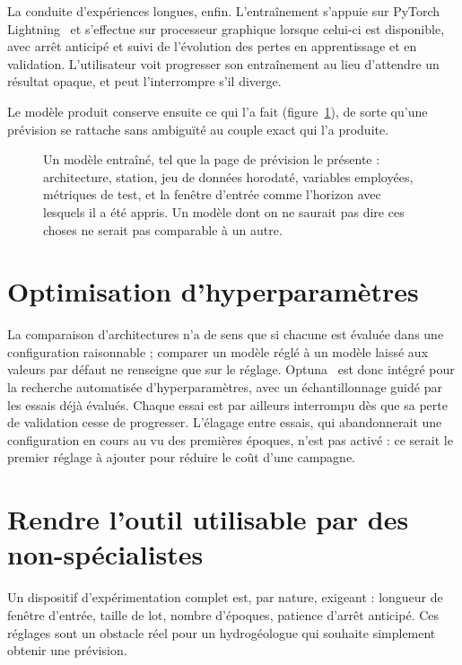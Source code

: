 La conduite d'expériences longues, enfin. L'entraînement s'appuie sur PyTorch Lightning~\cite{pytorch_lightning} et s'effectue sur
processeur graphique lorsque celui-ci est disponible, avec arrêt anticipé et suivi de
l'évolution des pertes en apprentissage et en validation. L'utilisateur voit progresser son
entraînement au lieu d'attendre un résultat opaque, et peut l'interrompre s'il diverge.

Le modèle produit conserve ensuite ce qui l'a fait (figure~\ref{fig:ia-modele}), de sorte qu'une
prévision se rattache sans ambiguïté au couple exact qui l'a produite.

\begin{figure}[htbp]
\centering
{}
\caption{Un modèle entraîné, tel que la page de prévision le présente : architecture, station,
jeu de données horodaté, variables employées, métriques de test, et la fenêtre d'entrée comme
l'horizon avec lesquels il a été appris. Un modèle dont on ne saurait pas dire ces choses ne
serait pas comparable à un autre. \lecas}
\label{fig:ia-modele}
\end{figure}

\section{Optimisation d'hyperparamètres}

La comparaison d'architectures n'a de sens que si chacune est évaluée dans une configuration
raisonnable ; comparer un modèle réglé à un modèle laissé aux valeurs par défaut ne renseigne
que sur le réglage. Optuna~\cite{optuna} est donc intégré pour la recherche automatisée d'hyperparamètres, avec un
échantillonnage guidé par les essais déjà évalués. Chaque essai est par ailleurs interrompu dès
que sa perte de validation cesse de progresser. L'élagage entre essais, qui abandonnerait une
configuration en cours au vu des premières époques, n'est pas activé : ce serait le premier
réglage à ajouter pour réduire le coût d'une campagne.

\section{Rendre l'outil utilisable par des non-spécialistes}

Un dispositif d'expérimentation complet est, par nature, exigeant : longueur de fenêtre
d'entrée, taille de lot, nombre d'époques, patience d'arrêt anticipé. Ces réglages sont un
obstacle réel pour un hydrogéologue qui souhaite simplement obtenir une prévision.


